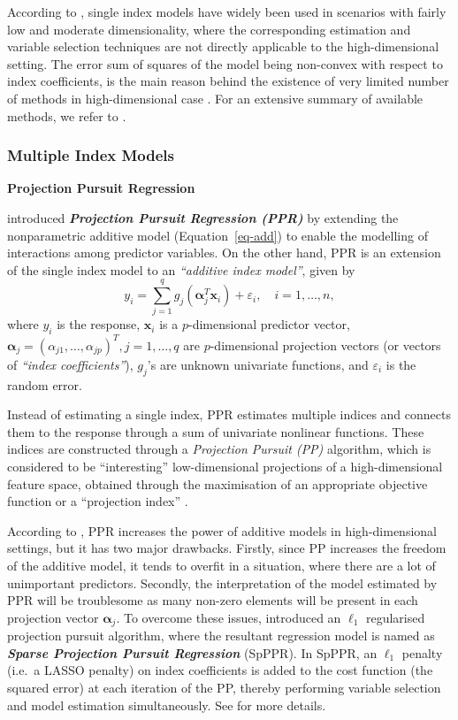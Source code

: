 \documentclass[11pt,a4paper,]{article}
\begin{document}
According to \textcite{Radchenko2015}, single index models have widely
been used in scenarios with fairly low and moderate dimensionality,
where the corresponding estimation and variable selection techniques are
not directly applicable to the high-dimensional setting. The error sum
of squares of the model being non-convex with respect to index
coefficients, is the main reason behind the existence of very limited
number of methods in high-dimensional case \autocite{Radchenko2015}. For
an extensive summary of available methods, we refer to
\textcite{Radchenko2015}.

\hypertarget{multiple-index-models}{%
\subsubsection{Multiple Index Models}\label{multiple-index-models}}

\textbf{Projection Pursuit Regression}

\textcite{Friedman1981} introduced \textbf{\emph{Projection Pursuit
Regression (PPR)}} by extending the nonparametric additive model
(Equation~\ref{eq-add}) to enable the modelling of interactions among
predictor variables. On the other hand, PPR is an extension of the
single index model to an \emph{``additive index model''}, given by \[
  y_{i} = \sum_{j=1}^{q} {g_{j}(\bm{\alpha}_{j}^{T}\bm{x}_{i})} + \varepsilon_{i}, \quad i = 1, \dots, n,
\] where \(y_{i}\) is the response, \(\bm{x}_{i}\) is a
\(p\)-dimensional predictor vector,
\(\bm{\alpha}_{j} = \left ( \alpha_{j1}, \dots, \alpha_{jp} \right )^{T}, j = 1, \dots, q\)
are \(p\)-dimensional projection vectors (or vectors of \emph{``index
coefficients''}), \(g_{j}\)'s are unknown univariate functions, and
\(\varepsilon_{i}\) is the random error.

Instead of estimating a single index, PPR estimates multiple indices and
connects them to the response through a sum of univariate nonlinear
functions. These indices are constructed through a \emph{Projection
Pursuit (PP)} \autocite{Kruskal1969,Friedman1974} algorithm, which is
considered to be ``interesting'' low-dimensional projections of a
high-dimensional feature space, obtained through the maximisation of an
appropriate objective function or a ``projection index''
\autocite{Huber1985}.

According to \textcite{Zhang2008}, PPR increases the power of additive
models in high-dimensional settings, but it has two major drawbacks.
Firstly, since PP increases the freedom of the additive model, it tends
to overfit in a situation, where there are a lot of unimportant
predictors. Secondly, the interpretation of the model estimated by PPR
will be troublesome as many non-zero elements will be present in each
projection vector \(\bm{\alpha}_{j}\). To overcome these issues,
\textcite{Zhang2008} introduced an \(\ell_{1}\) regularised projection
pursuit algorithm, where the resultant regression model is named as
\textbf{\emph{Sparse Projection Pursuit Regression}} (SpPPR). In SpPPR,
an \(\ell_{1}\) penalty (i.e.~a LASSO penalty) on index coefficients is
added to the cost function (the squared error) at each iteration of the
PP, thereby performing variable selection and model estimation
simultaneously. See \textcite{Zhang2008} for more details.
\end{document}
